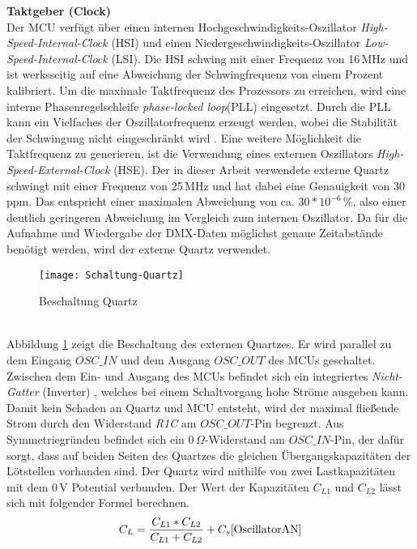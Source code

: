 \newline
\textbf{Taktgeber (Clock)}\\
Der MCU verfügt über einen internen Hochgeschwindigkeits-Oszillator \textit{High-Speed-Internal-Clock} (HSI) und einen Niedergeschwindigkeits-Oszillator \textit{Low-Speed-Internal-Clock} (LSI). Die HSI schwing mit einer Frequenz von 16\,MHz und ist werksseitig auf eine Abweichung der Schwingfrequenz von einem Prozent kalibriert. Um die maximale Taktfrequenz des Prozessors zu erreichen, wird eine interne Phasenregelschleife \textit{phase-locked loop}(PLL) eingesetzt. Durch die PLL kann ein Vielfaches der Oszillatorfrequenz erzeugt werden, wobei die Stabilität der Schwingung nicht eingeschränkt wird \cite[S. 270]{Ehrhardt1992}. Eine weitere Möglichkeit die Taktfrequenz zu generieren, ist die Verwendung eines externen Oszillators \textit{High-Speed-External-Clock} (HSE). Der in dieser Arbeit verwendete externe Quartz schwingt mit einer Frequenz von 25\,MHz und hat dabei eine Genauigkeit von 30\,ppm. Das entspricht einer maximalen Abweichung von ca. \(30*10^{-6}\)\,\%, also einer deutlich geringeren Abweichung im Vergleich zum internen Oszillator. Da für die Aufnahme und Wiedergabe der DMX-Daten möglichst genaue Zeitabstände benötigt werden, wird der externe Quartz verwendet.
\begin{figure}[!h]
	\begin{center}
			\texttt{[image: Schaltung-Quartz]}
			\caption{Beschaltung Quartz}
			\label{fig:Quartz}
	\end{center}
\end{figure}\\
Abbildung \ref{fig:Quartz} zeigt die Beschaltung des externen Quartzes. Er wird parallel zu dem Eingang $OSC\_IN$ und dem Ausgang $OSC\_OUT$ des MCUs geschaltet. Zwischen dem Ein- und Ausgang des MCUs befindet sich ein integriertes \textit{Nicht-Gatter} (Inverter) \cite[S. 11]{OscillatorAN}, welches bei einem Schaltvorgang hohe Ströme ausgeben kann. Damit kein Schaden an Quartz und MCU entsteht, wird der maximal fließende Strom durch den Widerstand \textit{R1C} am $OSC\_OUT$-Pin begrenzt. Aus Symmetriegründen befindet sich ein 0\,$\Omega$-Widerstand am $OSC\_IN$-Pin, der dafür sorgt, dass auf beiden Seiten des Quartzes die gleichen Übergangskapazitäten der Lötstellen vorhanden sind. Der Quartz wird mithilfe von zwei Lastkapazitäten mit dem 0\,V Potential verbunden. Der Wert der Kapazitäten \textit{$C_{L1}$} und \textit{$C_{L2}$} lässt sich mit folgender Formel berechnen.
\begin{equation}
		C_L = \frac{C_{L1} * C_{L2}} {C_{L1} + C_{L2}} + C_s \cite[S. 12]{OscillatorAN}
\end{equation}
